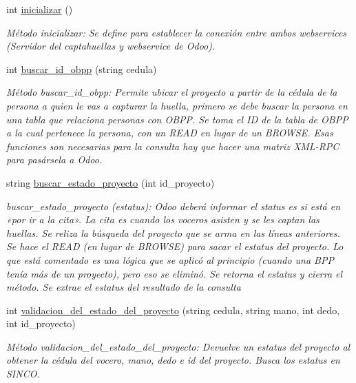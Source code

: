 \begin{DoxyCompactItemize}
int \hyperlink{classestado__proyecto_a823dcbf923e91074f2f7dd4501d578e9}{inicializar} ()
\begin{DoxyCompactList}\small\item\em Método inicializar\+: Se define para establecer la conexión entre ambos webservices (Servidor del captahuellas y webservice de Odoo). \end{DoxyCompactList}\item 
int \hyperlink{classestado__proyecto_a9e5d463c32524544b33ac2f069d8eb13}{buscar\+\_\+id\+\_\+obpp} (string cedula)
\begin{DoxyCompactList}\small\item\em Método buscar\+\_\+id\+\_\+obpp\+: Permite ubicar el proyecto a partir de la cédula de la persona a quien le vas a capturar la huella, primero se debe buscar la persona en una tabla que relaciona personas con O\+B\+PP. Se toma el ID de la tabla de O\+B\+PP a la cual pertenece la persona, con un R\+E\+AD en lugar de un B\+R\+O\+W\+SE. Esas funciones son necesarias para la consulta hay que hacer una matriz X\+M\+L-\/\+R\+PC para pasársela a Odoo. \end{DoxyCompactList}\item 
string \hyperlink{classestado__proyecto_a888654e845012a36987ae8b1956f2841}{buscar\+\_\+estado\+\_\+proyecto} (int id\+\_\+proyecto)
\begin{DoxyCompactList}\small\item\em buscar\+\_\+estado\+\_\+proyecto (estatus)\+: Odoo deberá informar el status es si está en «por ir a la cita». La cita es cuando los voceros asisten y se les captan las huellas. Se reliza la búsqueda del proyecto que se arma en las líneas anteriores. Se hace el R\+E\+AD (en lugar de B\+R\+O\+W\+SE) para sacar el estatus del proyecto. Lo que está comentado es una lógica que se aplicó al principio (cuando una B\+PP tenía más de un proyecto), pero eso se eliminó. Se retorna el estatus y cierra el método. Se extrae el estatus del resultado de la consulta \end{DoxyCompactList}\item 
int \hyperlink{classestado__proyecto_a8033814539c3d61e0bddd29254b07355}{validacion\+\_\+del\+\_\+estado\+\_\+del\+\_\+proyecto} (string cedula, string mano, int dedo, int id\+\_\+proyecto)
\begin{DoxyCompactList}\small\item\em Método validacion\+\_\+del\+\_\+estado\+\_\+del\+\_\+proyecto\+: Devuelve un estatus del proyecto al obtener la cédula del vocero, mano, dedo e id del proyecto. Busca los estatus en S\+I\+N\+CO. \end{DoxyCompactList}\item 

\end{DoxyCompactItemize}
